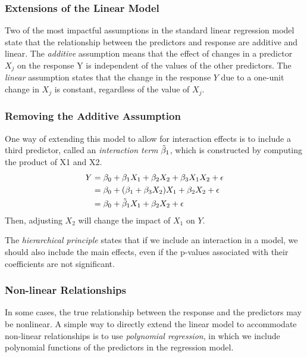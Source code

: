 \documentclass{article}
\numberwithin{equation}{section}
\begin{document}
\subsubsection{Extensions of the Linear Model}
Two of the most impactful assumptions in the standard linear regression model state that the relationship between the predictors and response are additive and linear. The \textit{additive} assumption means that the effect of changes in a predictor $X_j$ on the response Y is independent of the values of the other predictors. The \textit{linear} assumption states that the change in the response $Y$ due to a one-unit change in $X_j$ is constant, regardless of the value of $X_j$.

\subsubsection*{Removing the Additive Assumption}
One way of extending this model to allow for interaction effects is to include a third predictor, called an \textit{interaction term} $\Tilde \beta_1$, which is constructed by computing the product of X1 and X2.
\begin{align*}
    Y &= \beta_0 + \beta_1 X_ 1 + \beta_2 X_2 + \beta_3 X_1 X_2 + \epsilon \\
    &= \beta_0 + (\beta_1 + \beta_3 X_2)X_1 + \beta_2 X_2 + \epsilon \\
    &= \beta_0 + \Tilde \beta_1 X_1 + \beta_2 X_2 + \epsilon
\end{align*}
Then, adjusting $X_2$ will change the impact of $X_1$ on $Y$.

The \textit{hierarchical principle} states that if we include an interaction in a model, we should also include the main effects, even if the p-values associated with their coefficients are not significant.
 
\subsubsection*{Non-linear Relationships}
In some cases, the true relationship between the response and the predictors may be nonlinear. A simple way to directly extend the linear model to accommodate non-linear relationships is to use \textit{polynomial regression}, in which we include polynomial functions of the predictors in the regression model.
\end{document}
